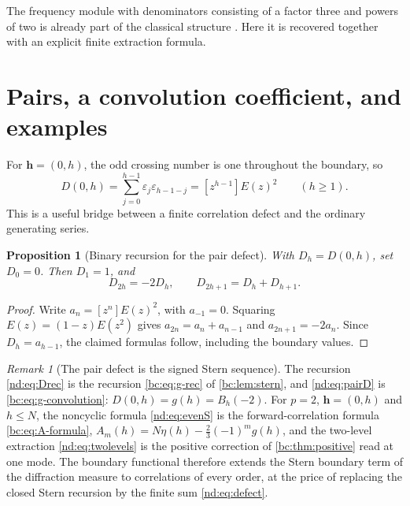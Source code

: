\documentclass[11pt,a4paper,oneside,openany]{book}
\numberwithin{equation}{chapter}
\newtheorem{proposition}[theorem]{Proposition}
\theoremstyle{definition}
\theoremstyle{remark}
\newtheorem{remark}[theorem]{Remark}
\newcommand{\eps}{\varepsilon}
\begin{document}
The frequency module with denominators consisting of a factor three and powers
of two is already part of the classical structure \cite{baake-coons}. Here it
is recovered together with an explicit finite extraction formula.

\section{Pairs, a convolution coefficient, and examples}
For \(\bm h=(0,h)\), the odd crossing number is one throughout the boundary,
so
\begin{equation}
 D(0,h)=\sum_{j=0}^{h-1}\eps_j\eps_{h-1-j}
       =[z^{h-1}]E(z)^2\qquad(h\ge1).
 \label{nd:eq:pairD}
\end{equation}
This is a useful bridge between a finite correlation defect and the ordinary
generating series.

\begin{proposition}[Binary recursion for the pair defect]
With \(D_h=D(0,h)\), set \(D_0=0\). Then \(D_1=1\), and
\begin{equation}
 D_{2h}=-2D_h,\qquad D_{2h+1}=D_h+D_{h+1}.
 \label{nd:eq:Drec}
\end{equation}
\end{proposition}
\begin{proof}
Write \(a_n=[z^n]E(z)^2\), with \(a_{-1}=0\). Squaring
\(E(z)=(1-z)E(z^2)\) gives
\(a_{2n}=a_n+a_{n-1}\) and \(a_{2n+1}=-2a_n\).
Since \(D_h=a_{h-1}\), the claimed formulas follow, including the boundary
values.
\end{proof}

\begin{remark}[The pair defect is the signed Stern sequence]
The recursion \eqref{nd:eq:Drec} is the recursion \eqref{bc:eq:g-rec} of
\cref{bc:lem:stern}, and \eqref{nd:eq:pairD} is \eqref{bc:eq:g-convolution}:
$D(0,h)=g(h)=B_h(-2)$. For $p=2$, $\bm h=(0,h)$ and $h\le N$, the noncyclic
formula \eqref{nd:eq:evenS} is the forward-correlation formula
\eqref{bc:eq:A-formula}, $A_m(h)=N\eta(h)-\tfrac23(-1)^mg(h)$, and the
two-level extraction \eqref{nd:eq:twolevels} is the positive correction of
\cref{bc:thm:positive} read at one mode. The boundary functional therefore
extends the Stern boundary term of the diffraction measure to correlations of
every order, at the price of replacing the closed Stern recursion by the
finite sum \eqref{nd:eq:defect}.
\end{remark}
\end{document}
